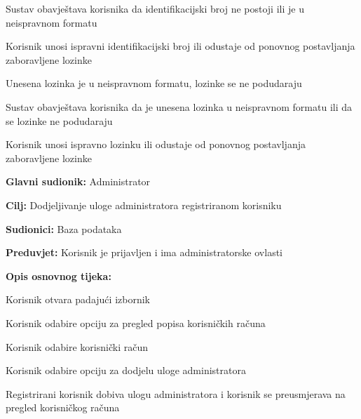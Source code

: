 \begin{packed_item}
\begin{packed_item}
\begin{packed_enum}
			\item Sustav obavještava korisnika da identifikacijski broj ne postoji ili je u neispravnom formatu
			\item Korisnik unosi ispravni identifikacijski broj ili odustaje od ponovnog postavljanja zaboravljene lozinke

		\end{packed_enum}
		\item[5.a] Unesena lozinka je u neispravnom formatu, lozinke se ne podudaraju
		\item[] \begin{packed_enum}

			\item Sustav obavještava korisnika da je unesena lozinka u neispravnom formatu ili da se lozinke ne podudaraju
			\item Korisnik unosi ispravno lozinku ili odustaje od ponovnog postavljanja zaboravljene lozinke

		\end{packed_enum}
	\end{packed_item}
\end{packed_item}


\noindent {}
\begin{packed_item}

	\item \textbf{Glavni sudionik: }Administrator
	\item  \textbf{Cilj:} Dodjeljivanje uloge administratora registriranom korisniku
	\item  \textbf{Sudionici:} Baza podataka
	\item  \textbf{Preduvjet:} Korisnik je prijavljen i ima administratorske ovlasti
	\item  \textbf{Opis osnovnog tijeka:}

	\item[] \begin{packed_enum}

		\item Korisnik otvara padajući izbornik 
		\item Korisnik odabire opciju za pregled popisa korisničkih računa
		\item Korisnik odabire korisnički račun
		\item Korisnik odabire opciju za dodjelu uloge administratora
		\item Registrirani korisnik dobiva ulogu administratora i korisnik se preusmjerava na pregled korisničkog računa
	\end{packed_enum}
\end{packed_item}



